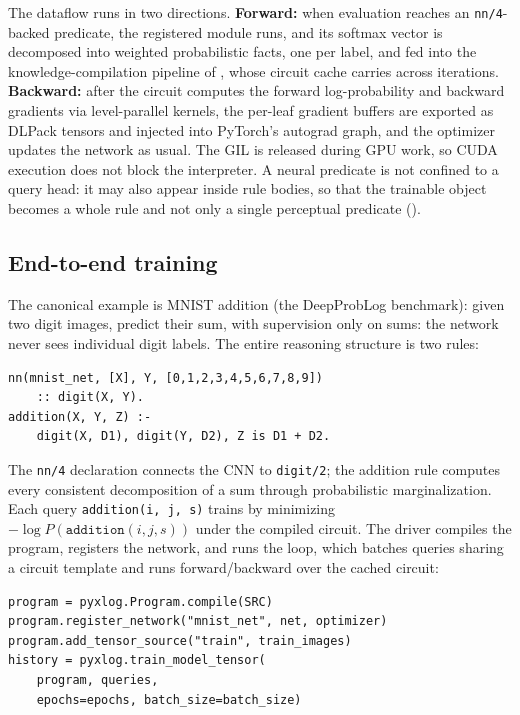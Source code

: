 The dataflow runs in two directions. \textbf{Forward:} when evaluation reaches an \texttt{nn/4}-backed predicate, the registered module runs, and its softmax vector is decomposed into weighted probabilistic facts, one per label, and fed into the knowledge-compilation pipeline of , whose circuit cache carries across iterations. \textbf{Backward:} after the circuit computes the forward log-probability and backward gradients via level-parallel kernels, the per-leaf gradient buffers are exported as DLPack tensors and injected into PyTorch's autograd graph, and the optimizer updates the network as usual. The GIL is released during GPU work, so CUDA execution does not block the interpreter. A neural predicate is not confined to a query head: it may also appear inside rule bodies, so that the trainable object becomes a whole rule and not only a single perceptual predicate ().

\subsection{End-to-end training}

The canonical example is MNIST addition (the DeepProbLog benchmark): given two digit images, predict their sum, with supervision only on sums: the network never sees individual digit labels. The entire reasoning structure is two rules:

\begin{lstlisting}[style=xlogstyle,
                   caption={MNIST addition: a CNN-backed digit predicate and an addition rule.},
                   label={lst:mnist-prog}]
nn(mnist_net, [X], Y, [0,1,2,3,4,5,6,7,8,9])
    :: digit(X, Y).
addition(X, Y, Z) :-
    digit(X, D1), digit(Y, D2), Z is D1 + D2.
\end{lstlisting}

The \texttt{nn/4} declaration connects the CNN to \texttt{digit/2}; the addition rule computes every consistent decomposition of a sum through probabilistic marginalization. Each query \texttt{addition(i, j, s)} trains by minimizing $-\log P(\texttt{addition}(i, j, s))$ under the compiled circuit. The driver compiles the program, registers the network, and runs the loop, which batches queries sharing a circuit template and runs forward/backward over the cached circuit:

\begin{lstlisting}[style=pythonstyle,
                   caption={Python driver: compile, register, train.},
                   label={lst:mnist-train}]
program = pyxlog.Program.compile(SRC)
program.register_network("mnist_net", net, optimizer)
program.add_tensor_source("train", train_images)
history = pyxlog.train_model_tensor(
    program, queries,
    epochs=epochs, batch_size=batch_size)
\end{lstlisting}


